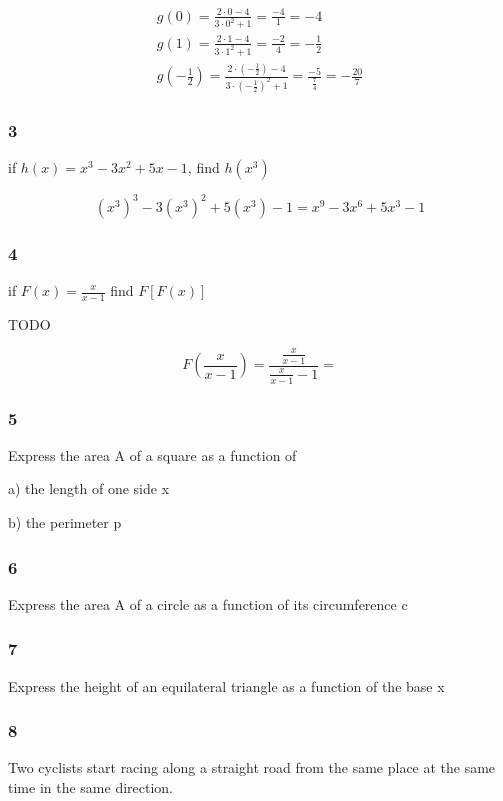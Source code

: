 \documentclass[]{report}
\begin{document}
\begin{align*}
g(0) = \frac{2\cdot0-4}{3\cdot0^2 + 1} = \frac{-4}{1} = -4\\
g(1) = \frac{2\cdot1 - 4}{3\cdot1^2 + 1} = \frac{-2}{4} = -\frac{1}{2}\\
g(-\frac{1}{2}) = \frac{2\cdot(-\frac{1}{2}) - 4}{3\cdot(-\frac{1}{2})^2 + 1} = \frac{-5}{\frac{7}{4}} = -\frac{20}{7}
\end{align*}


\subsubsection{3}
if $h(x) = x^3 - 3x^2 + 5x - 1$, find $h(x^3)$

\[
(x^3)^3 - 3(x^3)^2 + 5(x^3) - 1 = x^9 - 3x^6 + 5x^3 - 1
\]

\subsubsection{4}

if $F(x) = \frac{x}{x-1}$ find $F[F(x)]$

TODO

\[
F(\frac{x}{x-1}) = \frac{\frac{x}{x-1}}{\frac{x}{x-1}-1} = 
\]

\subsubsection{5}

Express the area A of a square as a function of 

a) the length of one side x

b) the perimeter p

\subsubsection{6}

Express the area A of a circle as a function of its circumference c

\subsubsection{7}
Express the height of an equilateral triangle as a function of the base x

\subsubsection{8}
Two cyclists start racing along a straight road from the same place at the same time in the same direction.
\end{document}
